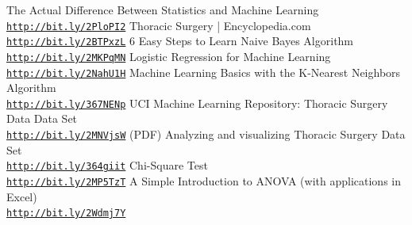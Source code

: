 \documentclass[a4paper, 11pt, oneside]{article} %
\begin{document}
 \begin{thebibliography}{9}

The Actual Difference Between Statistics and Machine Learning
\\\texttt{\url{http://bit.ly/2PloPI2}}
Thoracic Surgery | Encyclopedia.com
\\\texttt{\url{http://bit.ly/2BTPxzL}}
6 Easy Steps to Learn Naive Bayes Algorithm 
\\\texttt{\url{http://bit.ly/2MKPqMN}}
Logistic Regression for Machine Learning
\\\texttt{\url{http://bit.ly/2NahU1H}}
Machine Learning Basics with the K-Nearest Neighbors Algorithm
\\\texttt{\url{http://bit.ly/367NENp}}
UCI Machine Learning Repository: Thoracic Surgery Data Data Set
\\\texttt{\url{http://bit.ly/2MNVjsW}}
(PDF) Analyzing and visualizing Thoracic Surgery Data Set
\\\texttt{\url{http://bit.ly/364giit}}
Chi-Square Test
\\\texttt{\url{http://bit.ly/2MP5TzT}}
A Simple Introduction to ANOVA (with applications in Excel)
\\\texttt{\url{http://bit.ly/2Wdmj7Y}}
\end{thebibliography}
\end{document}

